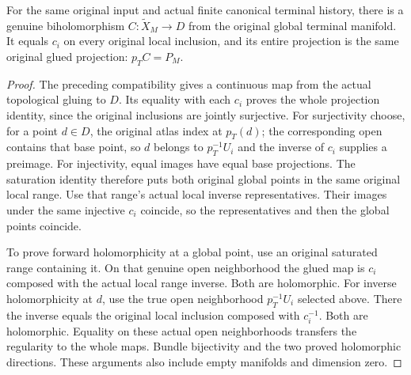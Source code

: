 \begin{theorem}
\label{hir:original-global-terminal-finite-whole-biholomorphism}
\leanok
{}
For the same original input and actual finite canonical terminal history,
there is a genuine biholomorphism $C:\widetilde X_M\to D$ from the original
global terminal manifold. It equals $c_i$ on every original local inclusion,
and its entire projection is the same original glued projection:
$p_T C=P_M$.
\end{theorem}
\begin{proof}
The preceding compatibility gives a continuous map from the actual
topological gluing to $D$. Its equality with each $c_i$ proves the whole
projection identity, since the original inclusions are jointly surjective.
For surjectivity choose, for a point $d\in D$, the original atlas index at
$p_T(d)$; the corresponding open contains that base point, so $d$ belongs
to $p_T^{-1}U_i$ and the inverse of $c_i$ supplies a preimage.
For injectivity, equal images have equal base projections. The saturation
identity therefore puts both original global points in the same original
local range. Use that range's actual local inverse representatives. Their
images under the same injective $c_i$ coincide, so the representatives and
then the global points coincide.

To prove forward holomorphicity at a global point, use an original saturated
range containing it. On that genuine open neighborhood the glued map is
$c_i$ composed with the actual local range inverse. Both are holomorphic.
For inverse holomorphicity at $d$, use the true open neighborhood
$p_T^{-1}U_i$ selected above. There the inverse equals the original local
inclusion composed with $c_i^{-1}$. Both are holomorphic. Equality on these
actual open neighborhoods transfers the regularity to the whole maps.
Bundle bijectivity and the two proved holomorphic directions. These
arguments also include empty manifolds and dimension zero.
\end{proof}
